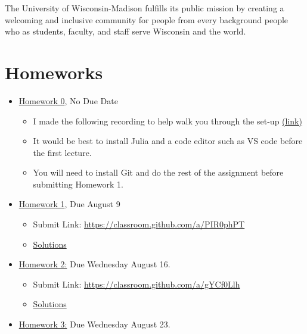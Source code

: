 \documentclass[
]{book}
\providecommand{\tightlist}{%
  \setlength{\itemsep}{0pt}\setlength{\parskip}{0pt}}
\begin{document}
The University of Wisconsin-Madison fulfills its public mission by creating a welcoming and inclusive community for people from every background people who as students, faculty, and staff serve Wisconsin and the world.

\hypertarget{homeworks}{%
\chapter{Homeworks}\label{homeworks}}

\begin{itemize}
\tightlist
\item
  \href{https://kevinghunt.github.io/ComputationCamp/homeworks/homework0.html}{Homework 0}, No Due Date

  \begin{itemize}
  \tightlist
  \item
    I made the following recording to help walk you through the set-up \href{https://uwmadison.zoom.us/rec/share/SbHWe_IMXFEaNy6ujwbKphJ2r3TgOvHtJqpkHT17NZDpX7cXcMdZhQtfmoC-WGNI.iN1B20YE_uH-QuFT?startTime=1690209565000}{(link)}
  \item
    It would be best to install Julia and a code editor such as VS code before the first lecture.
  \item
    You will need to install Git and do the rest of the assignment before submitting Homework 1.
  \end{itemize}
\item
  \href{https://kevinghunt.github.io/ComputationCamp/homeworks/homework1.html}{Homework 1}, Due August 9

  \begin{itemize}
  \tightlist
  \item
    Submit Link: \url{https://classroom.github.com/a/PIR0phPT}
  \item
    \href{https://kevinghunt.github.io/ComputationCamp/homework_solutions/Homework1_solutions.jl}{Solutions}
  \end{itemize}
\item
  \href{https://kevinghunt.github.io/ComputationCamp/homeworks/homework2.html}{Homework 2:} Due Wednesday August 16.

  \begin{itemize}
  \tightlist
  \item
    Submit Link: \url{https://classroom.github.com/a/gYCf0Llh}
  \item
    \href{https://kevinghunt.github.io/ComputationCamp/homework_solutions/Homework2_solutions.jl}{Solutions}
  \end{itemize}
\item
  \href{https://kevinghunt.github.io/ComputationCamp/homeworks/homework3.html}{Homework 3:} Due Wednesday August 23.


\end{itemize}
\end{document}
